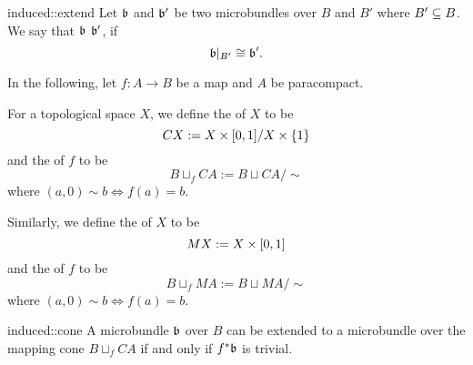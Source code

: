 \begin{mydefinition}{induced::extend}
    Let $\mathfrak{b}$ and $\mathfrak{b}'$ be two microbundles over $B$ and $B'$ where $B' \subseteq{} B$.
    We say that $\mathfrak{b}$  $\mathfrak{b}'$, if
    \[ \mathfrak{b}\vert_{B'} \cong \mathfrak{b}'. \]
\end{mydefinition}

\begin{myparagraph}
    In the following, let $f: A \to B$ be a map and $A$ be paracompact.
    
    For a topological space $X$, we define the  of $X$ to be 
    \[ CX := X \times{} [0, 1] / X \times \{1\} \]
    and the  of $f$ to be
    \[ B \sqcup_f CA := B \sqcup CA / \sim \]
    where $(a, 0) \sim b \iff f(a) = b$.
    
    Similarly, we define the  of $X$ to be
    \[ MX := X \times{} [0, 1] \]
    and the  of $f$ to be
    \[ B \sqcup_f MA := B \sqcup MA / \sim \]
    where $(a, 0) \sim b \iff f(a) = b$.
\end{myparagraph}

\begin{mylemma}{induced::cone}
    A microbundle $\mathfrak{b}$ over $B$ can be extended to a microbundle over the mapping cone $B \sqcup_f CA$ if and only if $f^*\mathfrak{b}$ is trivial.
\end{mylemma}

